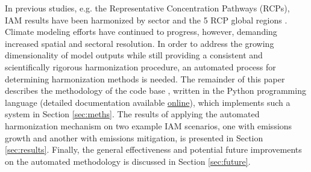 In previous studies, e.g. the Representative Concentration Pathways (RCPs), IAM
results have been harmonized by sector and the 5 RCP global regions
\cite{vuuren_representative_2011}. Climate modeling efforts have continued to
progress, however, demanding increased spatial and sectoral resolution. In order
to address the growing dimensionality of model outputs while still providing a
consistent and scientifically rigorous harmonization procedure, an automated
process for determining harmonization methods is needed. The remainder of this
paper describes the methodology of the  code base
\cite{matthew_gidden_2017_802832}, written in the Python programming language
(detailed documentation available \href{http://mattgidden.com/aneris/}{online}),
which implements such a system in Section \ref{sec:meths}. The results of
applying the automated harmonization mechanism on two example IAM scenarios, one
with emissions growth and another with emissions mitigation, is presented in
Section \ref{sec:results}. Finally, the general effectiveness and potential
future improvements on the automated methodology is discussed in Section
\ref{sec:future}.

